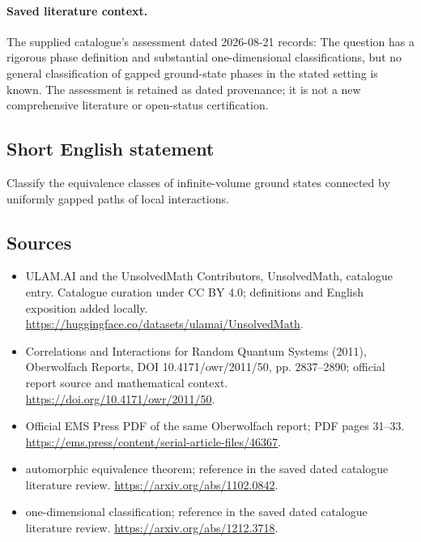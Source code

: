 \documentclass[11pt]{article}
\begin{document}
\paragraph{Saved literature context.} The supplied catalogue's assessment dated 2026-08-21 records: The question has a rigorous phase definition and substantial one-dimensional classifications, but no general classification of gapped ground-state phases in the stated setting is known. The assessment is retained as dated provenance; it is not a new comprehensive literature or open-status certification.
\subsection{Short English statement}
Classify the equivalence classes of infinite-volume ground states connected by uniformly gapped paths of local interactions.
\subsection{Sources}
\begin{itemize}
\item[\hypertarget{source:statement:1}{S1}] ULAM.AI and the UnsolvedMath Contributors, UnsolvedMath, catalogue entry. Catalogue curation under CC BY 4.0; definitions and English exposition added locally.
\url{https://huggingface.co/datasets/ulamai/UnsolvedMath}.
\item[\hypertarget{source:statement:2}{S2}] Correlations and Interactions for Random Quantum Systems (2011), Oberwolfach Reports, DOI 10.4171/owr/2011/50, pp. 2837--2890; official report source and mathematical context.
\url{https://doi.org/10.4171/owr/2011/50}.
\item[\hypertarget{source:statement:3}{S3}] Official EMS Press PDF of the same Oberwolfach report; PDF pages 31--33.
\url{https://ems.press/content/serial-article-files/46367}.
\item[\hypertarget{source:statement:4}{S4}] automorphic equivalence theorem; reference in the saved dated catalogue literature review.
\url{https://arxiv.org/abs/1102.0842}.
\item[\hypertarget{source:statement:5}{S5}] one-dimensional classification; reference in the saved dated catalogue literature review.
\url{https://arxiv.org/abs/1212.3718}.
\end{itemize}
\label{end:statement}
\end{document}
